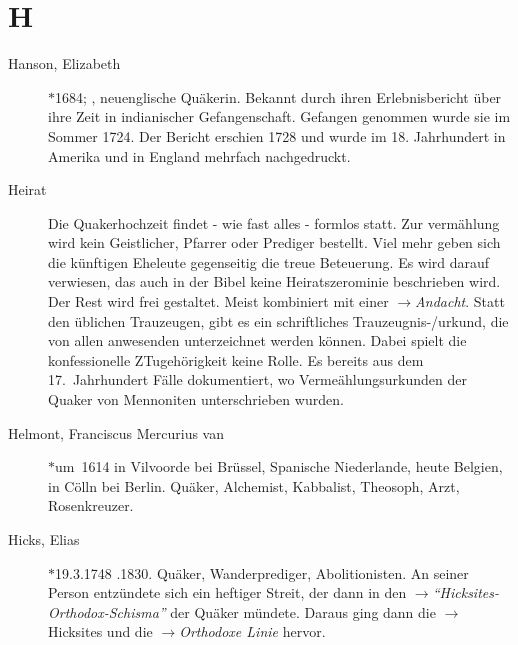 \section*{H}

\articlesize

\begin{description}

 \item[Hanson, Elizabeth] $\ast$1684; , neuenglische Quäkerin. Bekannt
 durch ihren Erlebnisbericht über ihre Zeit in indianischer Gefangenschaft.
 Gefangen genommen wurde sie im Sommer 1724. Der Bericht erschien 1728 und
 wurde im 18. Jahrhundert in Amerika und in England mehrfach nachgedruckt.


 \item[Heirat] Die Quakerhochzeit findet - wie fast alles - formlos statt. Zur
 vermählung wird kein Geistlicher, Pfarrer oder Prediger bestellt. Viel mehr
 geben sich die künftigen Eheleute gegenseitig die treue Beteuerung. Es wird
 darauf verwiesen, das auch in der Bibel keine Heiratszerominie beschrieben
 wird. Der Rest wird frei gestaltet. Meist kombiniert mit einer
 $\to$\textit{Andacht}. Statt den üblichen Trauzeugen, gibt es ein schriftliches
 Trauzeugnis-/urkund, die von allen anwesenden unterzeichnet werden können.
 Dabei spielt die konfessionelle ZTugehörigkeit keine Rolle. Es bereits aus dem
 17.~Jahrhundert Fälle dokumentiert, wo Vermeählungsurkunden der Quaker von
 Mennoniten unterschrieben wurden.

 \item[Helmont, Franciscus Mercurius van] $\ast$um~1614 in Vilvoorde bei Brüssel, Spanische Niederlande, heute Belgien,  in Cölln bei Berlin. Quäker, Alchemist, Kabbalist, Theosoph, Arzt, Rosenkreuzer.

 \item[Hicks, Elias] $\ast$19.3.1748 .1830. Quäker, Wanderprediger, Abolitionisten. An seiner Person entzündete sich ein heftiger Streit, der dann in den  $\to$\textit{"`Hicksites-Orthodox-Schisma"'} der Quäker mündete. Daraus ging dann die $\to$Hicksites und die $\to$\textit{Orthodoxe Linie} hervor.


\end{description}

